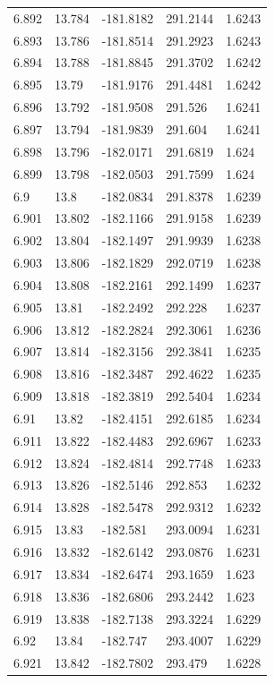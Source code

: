 \begin{tabular}{lllll}
6.892 & 13.784 & -181.8182 & 291.2144 & 1.6243 \\
6.893 & 13.786 & -181.8514 & 291.2923 & 1.6243 \\
6.894 & 13.788 & -181.8845 & 291.3702 & 1.6242 \\
6.895 & 13.79 & -181.9176 & 291.4481 & 1.6242 \\
6.896 & 13.792 & -181.9508 & 291.526 & 1.6241 \\
6.897 & 13.794 & -181.9839 & 291.604 & 1.6241 \\
6.898 & 13.796 & -182.0171 & 291.6819 & 1.624 \\
6.899 & 13.798 & -182.0503 & 291.7599 & 1.624 \\
6.9 & 13.8 & -182.0834 & 291.8378 & 1.6239 \\
6.901 & 13.802 & -182.1166 & 291.9158 & 1.6239 \\
6.902 & 13.804 & -182.1497 & 291.9939 & 1.6238 \\
6.903 & 13.806 & -182.1829 & 292.0719 & 1.6238 \\
6.904 & 13.808 & -182.2161 & 292.1499 & 1.6237 \\
6.905 & 13.81 & -182.2492 & 292.228 & 1.6237 \\
6.906 & 13.812 & -182.2824 & 292.3061 & 1.6236 \\
6.907 & 13.814 & -182.3156 & 292.3841 & 1.6235 \\
6.908 & 13.816 & -182.3487 & 292.4622 & 1.6235 \\
6.909 & 13.818 & -182.3819 & 292.5404 & 1.6234 \\
6.91 & 13.82 & -182.4151 & 292.6185 & 1.6234 \\
6.911 & 13.822 & -182.4483 & 292.6967 & 1.6233 \\
6.912 & 13.824 & -182.4814 & 292.7748 & 1.6233 \\
6.913 & 13.826 & -182.5146 & 292.853 & 1.6232 \\
6.914 & 13.828 & -182.5478 & 292.9312 & 1.6232 \\
6.915 & 13.83 & -182.581 & 293.0094 & 1.6231 \\
6.916 & 13.832 & -182.6142 & 293.0876 & 1.6231 \\
6.917 & 13.834 & -182.6474 & 293.1659 & 1.623 \\
6.918 & 13.836 & -182.6806 & 293.2442 & 1.623 \\
6.919 & 13.838 & -182.7138 & 293.3224 & 1.6229 \\
6.92 & 13.84 & -182.747 & 293.4007 & 1.6229 \\
6.921 & 13.842 & -182.7802 & 293.479 & 1.6228 \\

\end{tabular}
